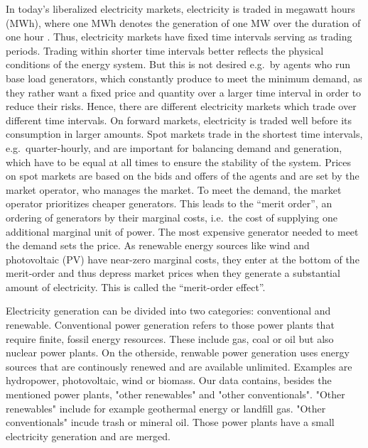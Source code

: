 \documentclass{article}
\begin{document}
In today's liberalized electricity markets, electricity is traded in megawatt hours (MWh), where one MWh denotes the generation of one MW over the duration of one hour \citep{markets_for_electrical_energy}.
Thus, electricity markets have fixed time intervals serving as trading periods.
Trading within shorter time intervals better reflects the physical conditions of the energy system.
But this is not desired e.g.\ by agents who run base load generators, which constantly produce to meet the minimum demand, as they rather want a fixed price and quantity over a larger time interval in order to reduce their risks.
Hence, there are different electricity markets which trade over different time intervals.
On forward markets, electricity is traded well before its consumption in larger amounts.
Spot markets trade in the shortest time intervals, e.g.\ quarter-hourly, and are important for balancing demand and generation, which have to be equal at all times to ensure the stability of the system.
Prices on spot markets are based on the bids and offers of the agents and are set by the market operator, who manages the market.
To meet the demand, the market operator prioritizes cheaper generators.
This leads to the \enquote{merit order}, an ordering of generators by their marginal costs, i.e.\ the cost of supplying one additional marginal unit of power.
The most expensive generator needed to meet the demand sets the price.
As renewable energy sources like wind and photovoltaic (PV) have near-zero marginal costs, they enter at the bottom of the merit-order and thus depress market prices when they generate a substantial amount of electricity.
This is called the \enquote{merit-order effect}.

Electricity generation can be divided into two categories: conventional and renewable. Conventional power generation refers to those power plants that require finite, fossil energy resources. These include gas, coal or oil but also nuclear power plants. On the otherside, renwable power generation uses energy sources that are continously renewed and are available unlimited. Examples are hydropower, photovoltaic, wind or biomass. Our data contains, besides the mentioned power plants, "other renewables" and "other conventionals". "Other renewables" include for example geothermal energy or landfill gas. "Other conventionals" incude trash or mineral oil. Those power plants have a small electricity generation and are merged. 
\end{document}
